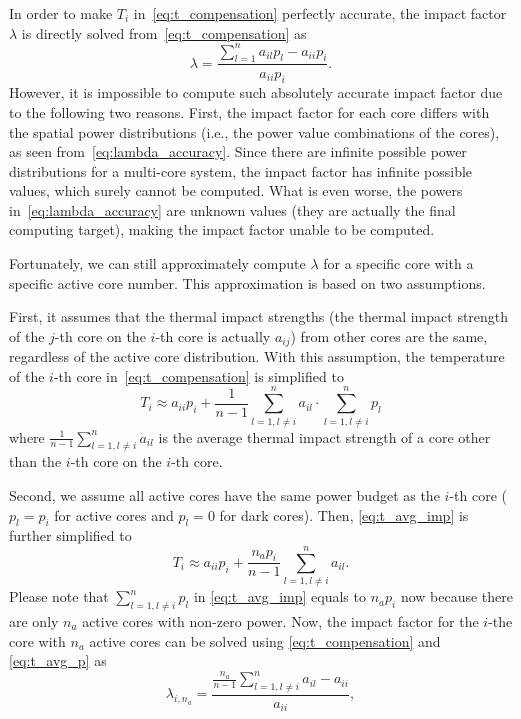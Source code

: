 In order to make $T_i$ in~\eqref{eq:t_compensation} perfectly accurate, the
impact factor $\lambda$ is directly solved
from~\eqref{eq:t_compensation} as
\begin{equation}\label{eq:lambda_accuracy}
\lambda =\frac{\sum_{l=1}^{n}a_{il}p_{l}-a_{ii}p_{i}}{a_{ii}p_{i}}.
\end{equation}
However, it is impossible to compute such absolutely accurate impact
factor due to the following two reasons. First, the impact factor for
each core differs with the spatial power distributions (i.e., the
power value combinations of the cores), as seen from~\eqref{eq:lambda_accuracy}. Since there are
infinite possible power distributions for a multi-core system, the impact
factor has infinite possible values, which surely cannot be computed. What is even worse, the powers
in~\eqref{eq:lambda_accuracy} are unknown values (they are actually
the final computing target), making the impact factor unable to be computed.

Fortunately, we can still approximately compute $\lambda$ for a
specific core with a specific active core number. This approximation
is based on two assumptions.

First, it assumes that the thermal impact
strengths (the thermal impact strength of the $j$-th core on the $i$-th
core is actually $a_{ij}$) from other cores are the same, regardless of the active core
distribution. With this assumption, the temperature of the $i$-th core
in~\eqref{eq:t_compensation} is simplified to
\begin{equation}\label{eq:t_avg_imp}
T_{i} \approx a_{ii}p_{i} + \frac{1}{n-1} \sum_{l=1, l \ne
  i}^{n} a_{il} \cdot \sum_{l=1, l \ne  i}^{n} p_l
\end{equation}
where $\frac{1}{n-1} \sum_{l=1, l \ne i}^{n} a_{il}$ is the average
thermal impact strength of a core other than the $i$-th core on the
$i$-th core.

Second, we assume all active cores have the same power
budget as the $i$-th core ($p_l = p_i$ for active cores and $p_l = 0$
for dark cores). Then, \eqref{eq:t_avg_imp} is further
simplified to
\begin{equation}\label{eq:t_avg_p}
T_{i} \approx a_{ii}p_{i} + \frac{n_a p_i}{n-1} \sum_{l=1, l \ne
  i}^{n} a_{il}.
\end{equation}
Please note that $\sum_{l=1, l \ne  i}^{n} p_l$ in \eqref{eq:t_avg_imp} equals to
$n_a p_i$ now because
there are only $n_a$ active cores with non-zero power. 
Now, the impact factor for the $i$-the core with $n_a$
active cores can be solved using \eqref{eq:t_compensation} and \eqref{eq:t_avg_p} as
\begin{equation}\label{eq:lambda}
  \lambda _{i,n_a} =\frac{\frac{n_a}{n-1} \sum_{l=1, l \ne i}^{n}a_{il}-a_{ii}}{a_{ii}},
\end{equation}




